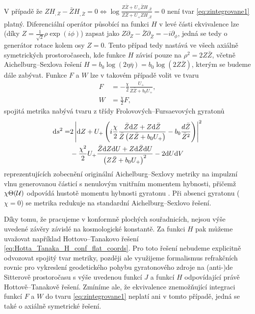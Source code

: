 V případě že $Z H_{,Z} - \bar{Z}H_{,\bar{Z}}=0 \iff \log \frac{Z \bar{Z} + U_{+}\bar{Z}H_{,\bar{Z}}}{Z\bar{Z}+U_{+}ZH_{,Z}}=0$
není tvar \eqref{eq:zintegrovane1} platný. Diferenciální operátor působící na funkci $H$ v levé části ekvivalence
lze (díky $Z = \frac{1}{\sqrt{2}} \rho \exp(i \phi)$) zapsat jako $Z \partial_Z - \bar{Z}\partial_{\bar{Z}} = - i \partial_\phi$,
jedná se tedy o generátor rotace kolem osy $Z = 0$. Tento případ tedy nastává ve všech axiálně symetrických prostoročasech, kde
funkce $H$ závisí pouze na $\rho^2 = 2 Z \bar{Z}$, včetně Aichelburg--Sexlova řešení
$H = b_0 \log(2\eta \bar{\eta}) = b_0 \log (2Z \bar{Z})$, kterým se budeme dále zabývat.
Funkce $F$ a $W$ lze v takovém případě volit ve tvaru
\begin{equation}
    \label{eq:zintegrovane2}
    \begin{split}
        F &= -\frac{\chi}{2} \frac{U_{+}}{Z \bar{Z} + b_0 U_{+}}, \\
        W &= \frac{\chi}{2}F,
    \end{split}
\end{equation}
spojitá metrika nabývá tvaru z třídy Frolovových--Fursaevových gyratonů \cite{Frolov2005} 
\begin{equation}
    \begin{split}
    \mathrm{d} s^2 = &2 \left| \mathrm{d} Z + U_{+} \left(i \frac{\chi}{2}\frac{\bar{Z}\mathrm{d} Z + Z \mathrm{d} \bar{Z}}{\bar{Z}\left(Z \bar{Z} + b_0 U_{+}\right)} - b_0 \frac{d\bar{Z}}{\bar{Z}^2}\right) \right|^2 \\
    &- \frac{\chi^2}{2}U_{+}\frac{\bar{Z} \mathrm{d} Z \mathrm{d} U + Z \mathrm{d} \bar{Z} \mathrm{d} U}{\left(Z \bar{Z} + b_0 U_{+}\right)^2} - 2 \mathrm{d} U \mathrm{d} V
    \end{split}
\end{equation}
reprezentujících zobecnění
originální Aichelburg--Sexlovy metriky \cite{Aichelburg_1971} na impulzní vlnu generovanou částicí s
nenulovým vnitřním momentem hybnosti, přičemž $\chi \Theta(\mathcal{U})$ odpovídá hustotě momentu hybnosti gyratonu \cite{Podolsky2014}.
Při absenci gyratonu ($\chi=0$) se metrika redukuje na standardní Aichelburg--Sexlovo řešení.

Díky tomu, že pracujeme v konformně plochých souřadnicích, nejsou výše uvedené závěry závislé na kosmologické konstantě.
Za funkci $H$ pak můžeme uvažovat například Hottovo--Tanakovo řešení \eqref{eq:Hotta_Tanaka_H_conf_flat_coords}. Pro toto řešení nebudeme explicitně odvozovat
spojitý tvar metriky, později ale využijeme formalismus refrakčních rovnic pro vykreslení geodetického pohybu gyratonového zdroje na (anti-)de Sitterově prostoročasu
s výše uvedenou funkcí $J$ a funkcí $H$ odpovídající právě Hottově--Tanakově řešení. Zmíníme ale, že ekvivalence znemožňující integraci funkcí $F$ a $W$ do tvaru
\eqref{eq:zintegrovane1} neplatí ani v tomto případě, jedná se také o axiálně symetrické řešení.


